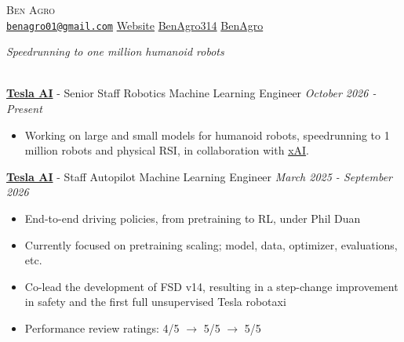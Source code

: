 \documentclass{article}
\newcommand{\tikzrule}[3][]{\tikz{\fill[#1] (0,0) rectangle (#2,#3);}\vspace{0.5em}}
\begin{document}
\begin{center}
{\Huge\textsc{Ben Agro}} \\
\vspace{2mm}
\href{mailto:benagro01@gmail.com}{ \texttt{benagro01@gmail.com}} \textbullet{} \href{https://benagro314.github.io/}{ Website} \textbullet{} \href{https://github.com/BenAgro314}{ BenAgro314} \textbullet{} \href{ https://www.linkedin.com/in/ben-agro-43a619196/}{ BenAgro}
\end{center}

\begin{center}
    \textit{
        Speedrunning to one million humanoid robots
    }
\end{center}

\vspace{0.5em}
\\
\tikzrule[black, path fading=east]{\textwidth}{1pt} 
\noindent{}\textbf{\href{https://www.tesla.com/AI}{Tesla AI}} - Senior Staff Robotics Machine Learning Engineer \hfill \faCalendar{} \textit{October 2026 - Present}
\begin{itemize}[noitemsep, topsep=1mm]
    \item Working on large and small models for humanoid robots, speedrunning to 1 million robots and physical RSI, in collaboration with \href{https://x.ai/}{xAI}.
\end{itemize}
\vspace{0.5em}

\noindent{}\textbf{\href{https://www.tesla.com/AI}{Tesla AI}} - Staff Autopilot Machine Learning Engineer \hfill \faCalendar{} \textit{March 2025 - September 2026}
\begin{itemize}[noitemsep, topsep=1mm]
    \item End-to-end driving policies, from pretraining to RL, under Phil Duan
    \item Currently focused on pretraining scaling; model, data, optimizer, evaluations, etc.
    \item Co-lead the development of FSD v14, resulting in a step-change improvement in safety and the first full unsupervised Tesla robotaxi
    \item Performance review ratings: 4/5 $\to$ 5/5 $\to$ 5/5
\end{itemize}
\vspace{0.5em}
\end{document}
